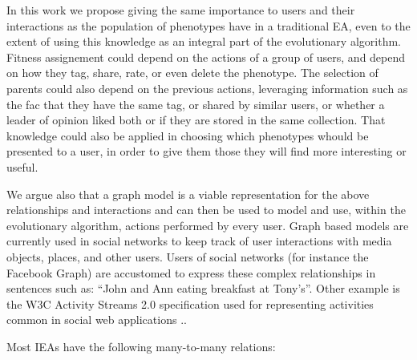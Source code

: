 \documentclass[conference]{IEEEtran}
\begin{document}
In this work we propose giving the same
importance to users and their interactions as the population of 
phenotypes have in a traditional EA, even to the extent of using this
knowledge as an integral part of the evolutionary algorithm. %
Fitness assignement could depend on the actions of a group of users, and depend on how
they tag, share, rate, or even delete the phenotype. The selection of parents could
also depend on the previous actions, leveraging information such as the fac that  they have the same tag, or shared by
similar users, or whether a leader of opinion liked both or if they are stored in the same collection.
That knowledge could also be applied in choosing which phenotypes whould be presented to a
user, in order to give them those they will find more interesting or useful. 

We argue also
that a graph model is a viable representation for the above relationships and
interactions and can then be used to model and use, within the
evolutionary algorithm, actions performed by every user. Graph based
models are currently used in social networks to keep track  
of user interactions with media objects, places, and other users. Users of
social networks (for instance the Facebook Graph) are accustomed to express these 
complex relationships in sentences such as: ``John and Ann eating breakfast at Tony's''. 
Other example is the W3C Activity Streams 2.0 specification used for representing activities 
common in social web applications \cite{json:streams}..  


Most IEAs have %
the following many-to-many relations:
\end{document}
